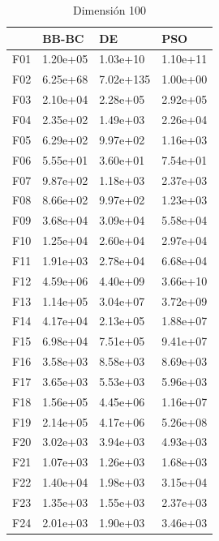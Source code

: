\begin{table}[H]
\begin{minipage}{.5\linewidth}
    \end{minipage}%
    \begin{minipage}{.5\linewidth}
      \centering
      \caption{Dimensión 100}
      \begin{tabular}{llll}
        \toprule
        {} &     BB-BC &         DE &       PSO \\
        \midrule
        F01  &  1.20e+05 &   1.03e+10 &  1.10e+11 \\
        F02  &  6.25e+68 &  7.02e+135 &  1.00e+00 \\
        F03  &  2.10e+04 &   2.28e+05 &  2.92e+05 \\
        F04  &  2.35e+02 &   1.49e+03 &  2.26e+04 \\
        F05  &  6.29e+02 &   9.97e+02 &  1.16e+03 \\
        F06  &  5.55e+01 &   3.60e+01 &  7.54e+01 \\
        F07  &  9.87e+02 &   1.18e+03 &  2.37e+03 \\
        F08  &  8.66e+02 &   9.97e+02 &  1.23e+03 \\
        F09  &  3.68e+04 &   3.09e+04 &  5.58e+04 \\
        F10  &  1.25e+04 &   2.60e+04 &  2.97e+04 \\
        F11  &  1.91e+03 &   2.78e+04 &  6.68e+04 \\
        F12  &  4.59e+06 &   4.40e+09 &  3.66e+10 \\
        F13  &  1.14e+05 &   3.04e+07 &  3.72e+09 \\
        F14  &  4.17e+04 &   2.13e+05 &  1.88e+07 \\
        F15  &  6.98e+04 &   7.51e+05 &  9.41e+07 \\
        F16  &  3.58e+03 &   8.58e+03 &  8.69e+03 \\
        F17  &  3.65e+03 &   5.53e+03 &  5.96e+03 \\
        F18  &  1.56e+05 &   4.45e+06 &  1.16e+07 \\
        F19  &  2.14e+05 &   4.17e+06 &  5.26e+08 \\
        F20  &  3.02e+03 &   3.94e+03 &  4.93e+03 \\
        F21  &  1.07e+03 &   1.26e+03 &  1.68e+03 \\
        F22  &  1.40e+04 &   1.98e+03 &  3.15e+04 \\
        F23  &  1.35e+03 &   1.55e+03 &  2.37e+03 \\
        F24  &  2.01e+03 &   1.90e+03 &  3.46e+03 \\

\end{tabular}
\end{minipage}
\end{table}
